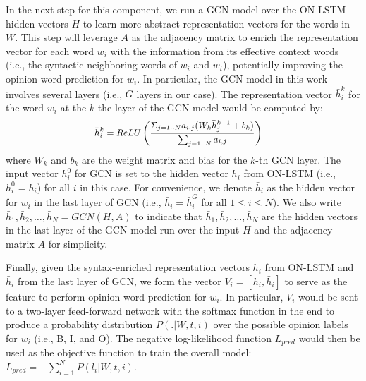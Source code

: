 \documentclass[11pt,a4paper]{article}
\begin{document}
In the next step for this component, we run a GCN model over the ON-LSTM hidden vectors $H$ to learn more abstract representation vectors for the words in $W$. This step will leverage $A$ as the adjacency matrix to enrich the representation vector for each word $w_i$ with the information from its effective context words (i.e., the syntactic neighboring words of $w_i$ and $w_t$), potentially improving the opinion word prediction for $w_i$. In particular, the GCN model in this work involves several layers (i.e., $G$ layers in our case). The representation vector $\bar{h}^k_i$ for the word $w_i$ at the $k$-the layer of the GCN model would be computed by:
\begin{equation}
\small
    \begin{split}
\bar{h}^k_i & = ReLU\left(\frac{\Sigma_{j=1..N} a_{i,j}(W_k \bar{h}^{k-1}_j + b_k)}{\sum_{j=1..N} a_{i,j}}\right)
    \end{split}
\end{equation}
where $W_k$ and $b_k$ are the weight matrix and bias for the $k$-th GCN layer. The input vector $h^0_i$ for GCN is set to the hidden vector $h_i$ from ON-LSTM (i.e., $h^0_i = h_i$) for all $i$ in this case. For convenience, we denote $\bar{h}_i$ as the hidden vector for $w_i$ in the last layer of GCN (i.e., $\bar{h}_i = \bar{h}^G_i$ for all $1 \le i \le N$). We also write $\bar{h}_1,\bar{h}_2,\ldots,\bar{h}_N = GCN(H, A)$ to indicate that $\bar{h}_1,\bar{h}_2,\ldots,\bar{h}_N$ are the hidden vectors in the last layer of the GCN model run over the input $H$ and the adjacency matrix $A$ for simplicity.

Finally, given the syntax-enriched representation vectors $h_i$ from ON-LSTM and $\bar{h}_i$ from the last layer of GCN, we form the vector $V_i = [h_i, \bar{h}_i]$ to serve as the feature to perform opinion word prediction for $w_i$. In particular, $V_i$ would be sent to a two-layer feed-forward network with the softmax function in the end to produce a probability distribution $P(.|W,t,i)$ over the possible opinion labels for $w_i$ (i.e., B, I, and O). The negative log-likelihood function $L_{pred}$ would then be used as the objective function to train the overall model: $L_{pred} = -\sum_{i=1}^N P(l_i|W,t,i)$.
\end{document}
